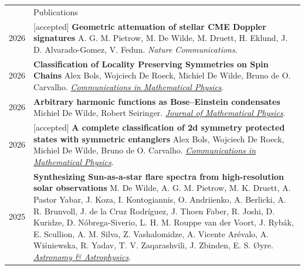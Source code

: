\documentclass[letterpaper, 11pt]{article}
\newcommand{\headingfont}{\Large\color{OliveGreen}}
\newenvironment{SectionTable}[1]{
	\renewcommand*{\arraystretch}{1.7}
	\setlength{\tabcolsep}{10pt}
	\begin{longtable}{Rp{5.2in}} & #1 \\}
{\end{longtable}\vspace{-1.5cm}}
\begin{document}
\newpage\begin{SectionTable}{\headingfont Publications}
2026 &
[accepted] \textbf{Geometric attenuation of stellar CME Doppler signatures} \newline
A. G. M. Pietrow, M. De Wilde, M. Druett, H. Eklund, J. D. Alvarado-Gomez, V. Fedun. \newline
\textit{Nature Communications}. \\
2026 &
\textbf{Classification of Locality Preserving Symmetries on Spin Chains} \newline
Alex Bols, Wojciech De Roeck, Michiel De Wilde, Bruno de O. Carvalho. \newline
\href{http://dx.doi.org/10.1007/s00220-025-05503-2}{\textit{Communications in Mathematical Physics}}. \\
2026 &
\textbf{Arbitrary harmonic functions as Bose–Einstein condensates} \newline
Michiel De Wilde, Robert Seiringer. \newline
\href{https://doi.org/10.1063/5.0325354}{\textit{Journal of Mathematical Physics}}. \\
2026 &
[accepted] \textbf{A complete classification of 2d symmetry protected states with symmetric entanglers} \newline
Alex Bols, Wojciech De Roeck, Michiel De Wilde, Bruno de O. Carvalho. \newline
\href{http://arxiv.org/abs/2603.09959v2}{\textit{Communications in Mathematical Physics}}. \\
2025 &
\textbf{Synthesizing Sun-as-a-star flare spectra from high-resolution solar observations} \newline
M. De Wilde, A. G. M. Pietrow, M. K. Druett, A. Pastor Yabar, J. Koza, I. Kontogiannis, O. Andriienko, A. Berlicki, A. R. Brunvoll, J. de la Cruz Rodríguez, J. Thoen Faber, R. Joshi, D. Kuridze, D. Nóbrega-Siverio, L. H. M. Rouppe van der Voort, J. Rybák, E. Scullion, A. M. Silva, Z. Vashalomidze, A. Vicente Arévalo, A. Wiśniewska, R. Yadav, T. V. Zaqarashvili, J. Zbinden, E. S. Øyre. \newline
\href{https://doi.org/10.1051/0004-6361/202554870}{\textit{Astronomy \& Astrophysics}}. \\
\end{SectionTable}
\end{document}
